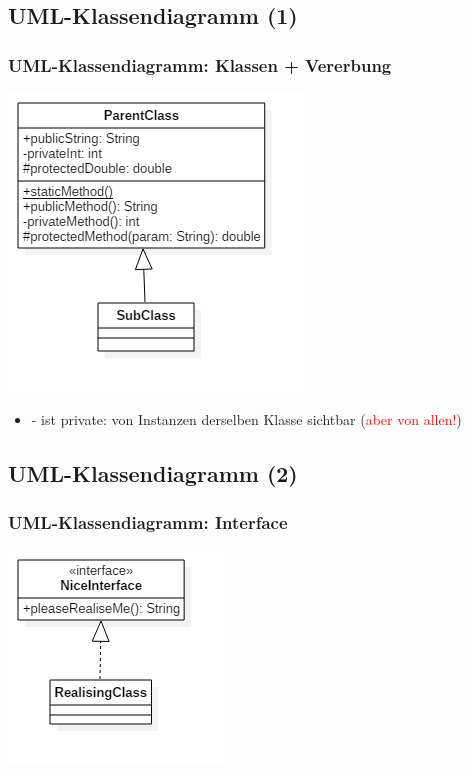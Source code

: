 \documentclass[18pt]{beamer}
\begin{document}
	\subsection{UML-Klassendiagramm (1)}
	\begin{frame}
		\frametitle{UML-Klassendiagramm: Klassen + Vererbung}
		\centering
		\includegraphics[scale=0.5]{./pics/tut1/inheritence.png}
		\pause
		\begin{small}
			\begin{itemize}
				\item - ist private: von Instanzen derselben Klasse sichtbar (\textcolor{red}{aber von allen!})
			\end{itemize}
		\end{small}
	\end{frame}
	
	\subsection{UML-Klassendiagramm (2)}
	\begin{frame}
		\frametitle{UML-Klassendiagramm: Interface}
		\centering
		\includegraphics[scale=0.7]{./pics/tut1/interface.png}
	\end{frame}
	
\end{document}
